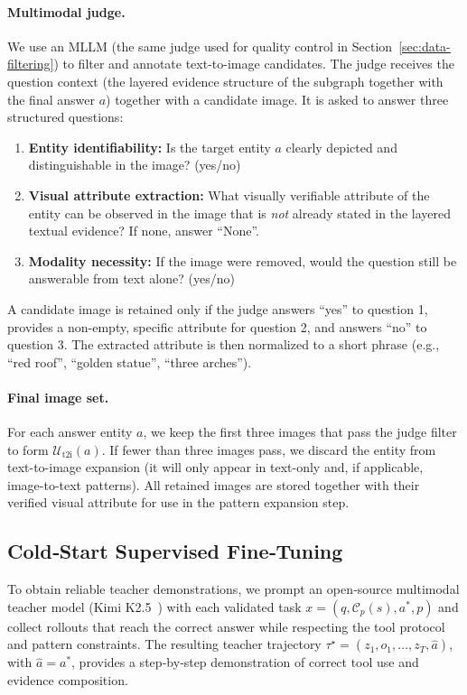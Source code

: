 \paragraph{Multimodal judge.}
We use an MLLM (the same judge used for quality control in Section~\ref{sec:data-filtering}) to filter and annotate text-to-image candidates. 
The judge receives the question context (the layered evidence structure of the subgraph together with the final answer $a$) together with a candidate image. 
It is asked to answer three structured questions:
\begin{enumerate}[leftmargin=*,nosep]
    \item \textbf{Entity identifiability:} Is the target entity $a$ clearly depicted and distinguishable in the image? (yes/no)
    \item \textbf{Visual attribute extraction:} What visually verifiable attribute of the entity can be observed in the image that is \emph{not} already stated in the layered textual evidence? If none, answer ``None''.
    \item \textbf{Modality necessity:} If the image were removed, would the question still be answerable from text alone? (yes/no)
\end{enumerate}
A candidate image is retained only if the judge answers ``yes'' to question 1, provides a non-empty, specific attribute for question 2, and answers ``no'' to question 3. 
The extracted attribute is then normalized to a short phrase (e.g., ``red roof'', ``golden statue'', ``three arches'').

\paragraph{Final image set.}
For each answer entity $a$, we keep the first three images that pass the judge filter to form $\mathcal{U}_{\mathrm{t2i}}(a)$. 
If fewer than three images pass, we discard the entity from text-to-image expansion (it will only appear in text-only and, if applicable, image-to-text patterns). 
All retained images are stored together with their verified visual attribute for use in the pattern expansion step.

\subsection{Cold‑Start Supervised Fine‑Tuning}
\label{sec:cold_start_sft}

To obtain reliable teacher demonstrations, we prompt an open‑source multimodal teacher model (Kimi K2.5~\citep{team2026kimi}) with each validated task $x=(q,\mathcal{C}_p(s),a^*,p)$ and collect rollouts that reach the correct answer while respecting the tool protocol and pattern constraints. The resulting teacher trajectory $\tau^\star=(z_1,o_1,\dots,z_T,\hat{a})$, with $\hat{a}=a^*$, provides a step‑by‑step demonstration of correct tool use and evidence composition.

